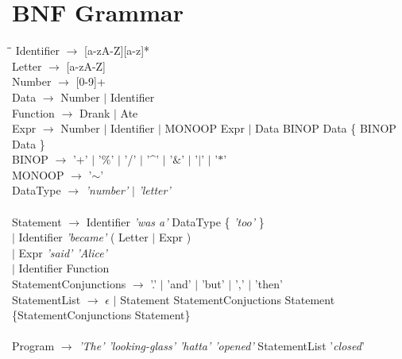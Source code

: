 \documentclass[a4wide, 11pt]{article}
\begin{document}
\section{BNF Grammar}
\label{sec:bnf}
	\begin{tabbing}
	\hspace*{8mm}\=\hspace*{25mm}\=\kill
		\> Identifier $\rightarrow$ [a-zA-Z][a-z]* \\
		\> Letter $\rightarrow$ [a-zA-Z] \\
		\> Number $\rightarrow$ [0-9]+ \\
		\> Data $\rightarrow$ Number $\mid$ Identifier \\
		\> Function $\rightarrow$ Drank $\mid$ Ate \\
		\> Expr	$\rightarrow$ Number $\mid$ Identifier $\mid$ MONOOP Expr 
					$\mid$ Data BINOP Data \{ BINOP Data \}\\
		\> BINOP $\rightarrow$ '+' $\mid$ '$\%$' $\mid$ '/' $\mid$ '\^{ }' 
							$\mid$ '$\&$' $\mid$ '$\mid$' $\mid$ '$\ast$' \\
		\> MONOOP $\rightarrow$ '$\mathtt{\sim}$'\\
		\> DataType $\rightarrow$ \emph{'number'} $\mid$ \emph{'letter'} \\
		\\
		\> Statement $\rightarrow$ Identifier \emph{'was a'} DataType \{ \emph{'too'} \}\\
		\> \> $\mid$ Identifier \emph{'became'} ( Letter $\mid$ Expr ) \\
		\> \>	$\mid$ Expr \emph{'said' 'Alice'} \\
		\> \> $\mid$ Identifier Function \\
		\> StatementConjunctions $\rightarrow$ '.' $\mid$ 'and' $\mid$ 'but' $\mid$ ',' $\mid$ 'then' \\
		\> StatementList $\rightarrow$ $\epsilon$ $\mid$ Statement StatementConjuctions Statement \{StatementConjunctions Statement\} \\
	 	\\
		\> Program $\rightarrow$ \emph{'The' 'looking-glass' 'hatta' 'opened'} StatementList '\emph{closed}'
	\end{tabbing}

\begin{verbatim}
\end{verbatim}
\end{document}
